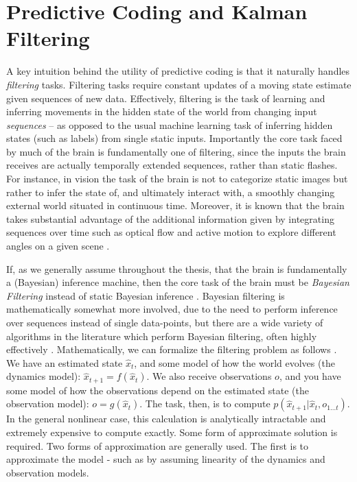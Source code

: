 \section{Predictive Coding and Kalman Filtering}

A key intuition behind the utility of predictive coding is that it naturally handles \emph{filtering} tasks. Filtering tasks require constant updates of a moving state estimate given sequences of new data. Effectively, filtering is the task of learning and inferring movements in the hidden state of the world from changing input \emph{sequences} -- as opposed to the usual machine learning task of inferring hidden states (such as labels) from single static inputs. Importantly the core task faced by much of the brain is fundamentally one of filtering, since the inputs the brain receives are actually temporally extended sequences, rather than static flashes. For instance, in vision the task of the brain is not to categorize static images but rather to infer the state of, and ultimately interact with, a smoothly changing external world situated in continuous time. Moreover, it is known that the brain takes substantial advantage of the additional information given by integrating sequences over time such as optical flow \citep{gibson2002theory} and active motion to explore different angles on a given scene \citep{henderson2017gaze}.

If, as we generally assume throughout the thesis, that the brain is fundamentally a (Bayesian) inference machine, then the core task of the brain must be \emph{Bayesian Filtering} instead of static Bayesian inference \citep{sarkka2013Bayesian}. Bayesian filtering is mathematically somewhat more involved, due to the need to perform inference over sequences instead of single data-points, but there are a wide variety of algorithms in the literature which perform Bayesian filtering, often highly effectively \citep{kutschireiter2018nonlinear,kutschireiter2020hitchhiker}. Mathematically, we can formalize the filtering problem as follows \citep*{jaswinskistochastic,stengel1994optimal}. We have an estimated state $\hat{x}_t$, and some model of how the world evolves (the dynamics model): $\hat{x}_{t+1} = f(\hat{x}_t)$. We also receive observations $o$, and you have some model of how the observations depend on the estimated state (the observation model): $o = g(\hat{x}_t)$. The task, then, is to compute $p(\hat{x}_{t+1} | \hat{x}_t, o_{1...t})$. In the general nonlinear case, this calculation is analytically intractable and extremely expensive to compute exactly. Some form of approximate solution is required. Two forms of approximation are generally used. The first is to approximate the model - such as by assuming linearity of the dynamics and observation models. 

